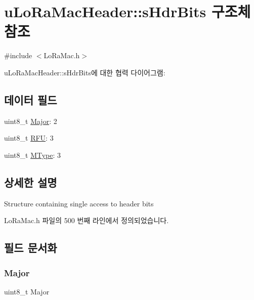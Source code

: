 \hypertarget{structu_lo_ra_mac_header_1_1s_hdr_bits}{}\section{u\+Lo\+Ra\+Mac\+Header\+:\+:s\+Hdr\+Bits 구조체 참조}
\label{structu_lo_ra_mac_header_1_1s_hdr_bits}


{\ttfamily \#include $<$Lo\+Ra\+Mac.\+h$>$}



u\+Lo\+Ra\+Mac\+Header\+:\+:s\+Hdr\+Bits에 대한 협력 다이어그램\+:
\subsection*{데이터 필드}
\begin{DoxyCompactItemize}
\item 
uint8\+\_\+t \mbox{\hyperlink{structu_lo_ra_mac_header_1_1s_hdr_bits_a9c6cb78b2f0ce027b8eb427523270d1d}{Major}}\+: 2
\item 
uint8\+\_\+t \mbox{\hyperlink{structu_lo_ra_mac_header_1_1s_hdr_bits_a1edefc7ee6540e182ed8705e51c90045}{R\+FU}}\+: 3
\item 
uint8\+\_\+t \mbox{\hyperlink{structu_lo_ra_mac_header_1_1s_hdr_bits_a1b16521f6356e21b690406a9aa7ce147}{M\+Type}}\+: 3
\end{DoxyCompactItemize}


\subsection{상세한 설명}
Structure containing single access to header bits 

Lo\+Ra\+Mac.\+h 파일의 500 번째 라인에서 정의되었습니다.



\subsection{필드 문서화}
\mbox{\label{structu_lo_ra_mac_header_1_1s_hdr_bits_a9c6cb78b2f0ce027b8eb427523270d1d}} 
\subsubsection{\texorpdfstring{Major}{Major}}
{\footnotesize\ttfamily uint8\+\_\+t Major}


